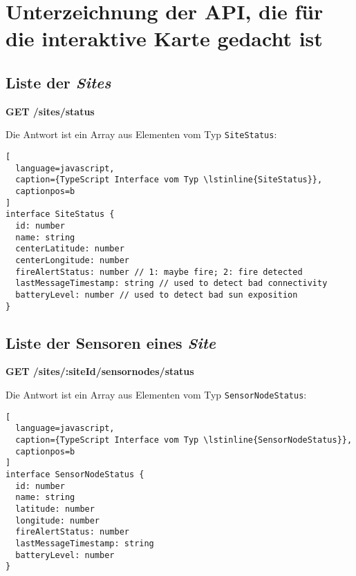 \section{Unterzeichnung der API, die für die interaktive Karte gedacht ist} \label{appendix:map-api}
\subsection{Liste der \textit{Sites}}

\textbf{GET /sites/status}

Die Antwort ist ein Array aus Elementen vom Typ \lstinline{SiteStatus}:

\begin{lstlisting}[
  language=javascript,
  caption={TypeScript Interface vom Typ \lstinline{SiteStatus}},
  captionpos=b
]
interface SiteStatus {
  id: number
  name: string
  centerLatitude: number
  centerLongitude: number
  fireAlertStatus: number // 1: maybe fire; 2: fire detected
  lastMessageTimestamp: string // used to detect bad connectivity
  batteryLevel: number // used to detect bad sun exposition
}
\end{lstlisting}

\subsection{Liste der Sensoren eines \textit{Site}}

\textbf{GET /sites/:siteId/sensornodes/status}

Die Antwort ist ein Array aus Elementen vom Typ \lstinline{SensorNodeStatus}:

\begin{lstlisting}[
  language=javascript,
  caption={TypeScript Interface vom Typ \lstinline{SensorNodeStatus}},
  captionpos=b
]
interface SensorNodeStatus {
  id: number
  name: string
  latitude: number
  longitude: number
  fireAlertStatus: number
  lastMessageTimestamp: string
  batteryLevel: number
}
\end{lstlisting}